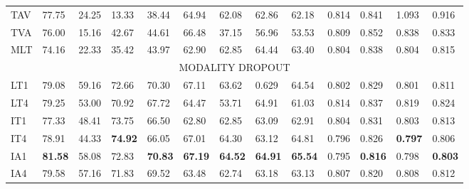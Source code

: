 \documentclass[a4paper,conference]{IEEEtran}
\begin{document}
\begin{table}[h]
\begin{tabular}{|p{12pt}|p{12pt}p{13pt}p{13pt}p{14pt}|p{12pt}p{13pt}p{13pt}p{14pt}|p{12pt}p{13pt}p{13pt}p{14pt}|}
\multicolumn{1}{|l|}{TAV}      & 77.75          & 24.25          & 13.33          & 38.44        & 64.94          & 62.08          & 62.86           & 62.18       & 0.814          & 0.841          & 1.093          & 0.916        \\
\multicolumn{1}{|l|}{TVA}      & 76.00          & 15.16          & 42.67          & 44.61       & 66.48          & 37.15          & 56.96           & 53.53        & 0.809          & 0.852          & 0.838          & 0.833        \\
\multicolumn{1}{|l|}{MLT }    & 74.16          & 22.33          & 35.42          & 43.97       & 62.90          & 62.85 & 64.44  & 63.40 & 0.804          & 0.838          & 0.804 & 0.815 \\ \hline
\multicolumn{13}{c}{MODALITY DROPOUT}                                                                                                                                                                                                                                                                     \\ \hline
\multicolumn{1}{|l|}{LT1} & 79.08               &      59.16          &   72.66             & {70.30}               & 67.11          & 63.62          & 0.629           & {64.54}          & 0.802          & 0.829          & 0.801          & {0.811}          \\
\multicolumn{1}{|l|}{LT4} & 79.25          & 53.00          & 70.92          & {67.72}          & 64.47          & 53.71          & 64.91           & {61.03}          & 0.814          & 0.837          & 0.819          & {0.824}          \\
\multicolumn{1}{|l|}{IT1}    &     77.33           & 48.41     &  73.75                & {66.50}               & 62.80          & 62.85          & 63.09           & {62.91}          & 0.804          & 0.831          & 0.803          & {0.813}          \\
\multicolumn{1}{|l|}{IT4}    & 78.91          & 44.33          & \textbf{74.92} & {66.05}          & 67.01          & 64.30          & 63.12           & {64.81}          & 0.796          & 0.826          & \textbf{0.797}          & {0.806}          \\
\multicolumn{1}{|l|}{IA1}    & \textbf{81.58} & 58.08          & 72.83          & {\textbf{70.83}} & \textbf{67.19} & \textbf{64.52} & \textbf{64.91} & {\textbf{65.54}}          & 0.795          & \textbf{0.816} & 0.798 & {\textbf{0.803}} \\
\multicolumn{1}{|l|}{IA4}    &      79.58          &     57.16           &    71.83            & {69.52}               & 63.48          & 62.74          & 63.18           & {63.13}          & 0.807          & 0.820          & 0.808          & {0.812}          \\

\end{tabular}
\end{table}
\end{document}
